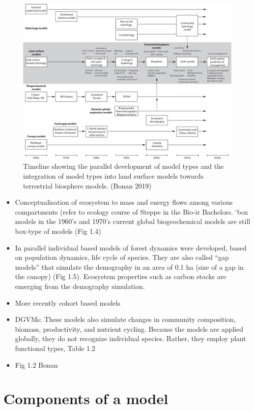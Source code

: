 \documentclass[
  oneside]{book}
\providecommand{\tightlist}{%
  \setlength{\itemsep}{0pt}\setlength{\parskip}{0pt}}
\begin{document}
\begin{figure}

{\centering \includegraphics[width=0.8\linewidth]{figures/chap1/timeline} 

}

\caption{Timeline showing the parallel development of model types and the integration of model types into land surface models towards terrestrial biosphere models. (Bonan 2019)}\label{fig:f7}
\end{figure}

\begin{itemize}
\tightlist
\item
  Conceptualisation of ecosystem to mass and energy flows among various compartments (refer to ecology course of Steppe in the Bio-ir Bachelors. `box models in the 1960's and 1970's current global biogeochemical models are still box-type of models (Fig 1.4)
\item
  In parallel individual based models of forest dynamics were developed, based on population dynamics, life cycle of species. They are also called ``gap models'' that simulate the demography in an area of 0.1 ha (size of a gap in the canopy) (Fig 1.5). Ecosystem properties such as carbon stocks are emerging from the demography simulation.
\item
  More recently cohort based models
\item
  DGVMs: These models also simulate changes in community composition, biomass, productivity, and nutrient cycling. Because the models are applied globally, they do not recognize individual species. Rather, they employ plant functional types, Table 1.2
\item
  Fig 1.2 Bonan
\end{itemize}

\hypertarget{components-of-a-model}{%
\section{Components of a model}\label{components-of-a-model}}
\end{document}
